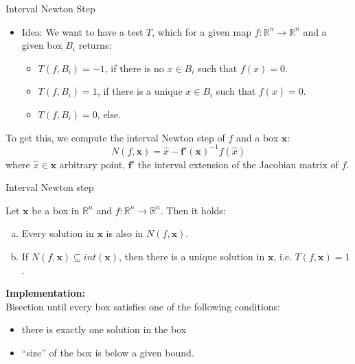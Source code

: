 \documentclass[german,10pt,xcolor=colortbl,compress, handout]{beamer}
\begin{document}
\begin{frame}{Interval Newton Step}
    \begin{itemize}
    \item Idea: We want to have a test $T$, which for a given map $f: \mathbb{R}^n \to
        \mathbb{R}^n$ and a given box $B_i$ returns:
        \begin{itemize}
            \item $T(f,B_i)=-1$, if there is no $x \in B_i$ such that $f(x)=0$.
            \item $T(f,B_i)=1$,  if there is a unique $x \in B_i$ such that $f(x)=0$.
            \item $T(f,B_i)=0$, else.
        \end{itemize}
    \end{itemize}
    \pause
    To get this, we compute the interval Newton step of $f$ and a box $\mathbf{x}$: $$
    N(f, \mathbf{x})= \hat{x} - \mathbf{f'}(\mathbf{x})^{-1}f(\hat{x})$$ where $\hat{x}
    \in \mathbf{x}$ arbitrary point, $\mathbf{f'}$ the interval extension of the Jacobian
    matrix of $f$.
\end{frame}

\begin{frame}{Interval Newton step}
    \begin{theorem}
        Let $\mathbf{x}$ be a box in $\mathbb{R}^n$ and $f:\mathbb{R}^n\to \mathbb{R}^n$.
        Then it holds:
        \begin{enumerate}[a)]
            \item Every solution in $\mathbf{x}$ is also in $N(f,\mathbf{x})$.
            \item If $N(f,\mathbf{x}) \subseteq int(\mathbf{x})$, then there is a unique
                solution in $\mathbf{x}$, i.e. $T(f,\mathbf{x})=1$.
        \end{enumerate}
    \end{theorem}
    \pause

    \textbf{Implementation:} \\
    Bisection until every box satisfies one of the following conditions:
    \begin{itemize}
        \item there is exactly one solution in the box
        \item \enquote{size} of the box is below a given bound.
    \end{itemize}
\end{frame}
\end{document}
